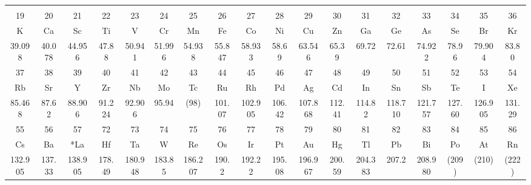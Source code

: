 \documentclass[10pt,landscape]{article}
\begin{document}
\begin{center}
\begin{tabular}{|c|c|p{17.8mm}*{9}{p{8.98mm}}|c|c|c|c|c|c|}
\hline
\end{tabular}
\vspace{-3mm}
\begin{tabular}{|c*{16}{|c}|c|}
&&&&&&&&&&&&&&&&&\\[-6.8mm]
\small 19 & \small 20 & \small 21 & \small 22 & \small 23 & \small 24 & \small 25 & \small 26 & \small 27 & \small 28 & \small 29 & \small 30 & \small 31 & \small 32 & \small 33 & \small 34 & \small 35 & \small 36\\
K & Ca & Sc & Ti & V & Cr & Mn & Fe & Co & Ni & Cu & Zn & Ga & Ge & As & Se & Br & Kr\\[-2mm]
\small 39.098 & \small 40.078 & \small 44.956 & \small 47.88 & \small 50.941 & \small 51.996 & \small 54.938 & \small 55.847 & \small 58.933 & \small 58.69 & \small 63.546 & \small 65.39 & \small 69.72 & \small 72.61 & \small 74.922 & \small 78.96 & \small 79.904 & \small 83.80\\[-1mm]
\hline
\small 37 & \small 38 & \small 39 &\small 40& \small 41 & \small 42 & \small 43 & \small 44 & \small 45 & \small 46 & \small 47 & \small 48 & \small 49 & \small 50 & \small 51 & \small 52 & \small 53 & \small 54\\[-1mm]
Rb & Sr & Y & Zr & Nb & Mo & Tc & Ru & Rh & Pd & Ag & Cd & In & Sn & Sb & Te & I & Xe\\[-2mm]
\small 85.468 & \small 87.62 & \small 88.906 & \small 91.224 & \small 92.906 & \small 95.94 & \small (98) & \small 101.07 & \small 102.905 & \small 106.42 & \small 107.868 & \small 112.41 & \small 114.82 & \small 118.710 & \small 121.757 & \small 127.60 & \small 126.905 & \small 131.29\\[-1mm]
\hline
\small 55 & \small 56 & \small 57 & \small 72 & \small 73 & \small 74 & \small 75 & \small 76 & \small 77 & \small 78 & \small 79 & \small 80 & \small 81 & \small 82 & \small 83 & \small 84 & \small 85 & \small 86\\[-1mm]
Cs & Ba & *La & Hf & Ta & W & Re & Os & Ir & Pt & Au & Hg & Tl & Pb & Bi & Po & At & Rn\\[-2mm]
\small 132.905 & \small 137.33 & \small 138.905 & \small 178.49 & \small 180.948 & \small 183.85 & \small 186.207 & \small 190.2 & \small 192.22 & \small 195.08 & \small 196.967 & \small 200.59 & \small 204.383 & \small 207.2 & \small 208.980 & \small (209) & \small (210) & \small (222)\\

\end{tabular}
\end{center}
\end{document}
